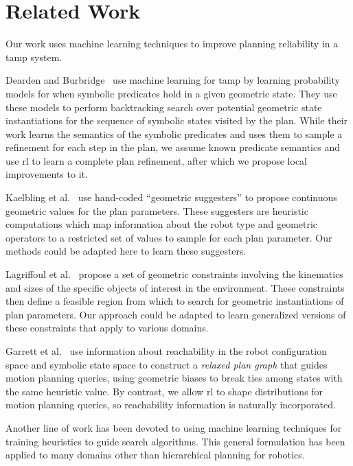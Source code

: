 \section{Related Work}
Our work uses machine learning techniques to improve planning reliability in a {\sc tamp} system.

Dearden and Burbridge~\cite{deardenplanningtamp} use machine learning for {\sc tamp} by learning probability
models for when symbolic predicates hold in a given geometric state. They use these models to perform backtracking search
over potential geometric state instantiations for the sequence of symbolic states visited by the plan. While
their work learns the semantics of the symbolic predicates and uses them to sample a refinement for each step
in the plan, we assume known predicate semantics and use {\sc rl} to learn a complete plan refinement, after which we
propose local improvements to it.

Kaelbling et al.~\cite{kaelbling2011hierarchical} use hand-coded ``geometric suggesters'' to propose
continuous geometric values for the plan parameters. These suggesters are heuristic
computations which map information about the robot type and geometric operators to a restricted
set of values to sample for each plan parameter. Our methods could be adapted here to learn these
suggesters.

Lagriffoul et al.~\cite{lagriffoul2014orientation}
propose a set of geometric constraints involving the kinematics and sizes of the specific objects of
interest in the environment. These constraints then define a feasible region from which to search
for geometric instantiations of plan parameters. Our approach could be adapted to learn generalized
versions of these constraints that apply to various domains.

Garrett et al.~\cite{GarrettWAFR14} use information about reachability in the robot configuration
space and symbolic state space to construct a \emph{relaxed plan graph} that guides motion
planning queries, using geometric biases to break ties among states with the same heuristic value.
By contrast, we allow {\sc rl} to shape distributions for motion planning queries, so reachability information
is naturally incorporated.

Another line of work has been devoted to using machine learning techniques for
training heuristics to guide search algorithms. This general formulation
has been applied to many domains other than hierarchical planning for robotics.


